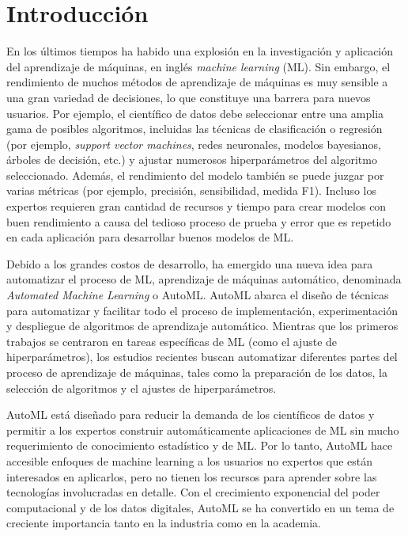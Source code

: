 \chapter*{Introducción}\label{chapter:introduction}

\qquad 

En los últimos tiempos ha habido una explosión en la investigación y aplicación del aprendizaje de máquinas, en inglés \textit{machine learning} (ML). Sin embargo, el rendimiento de muchos métodos de aprendizaje de máquinas es muy sensible a una gran variedad de decisiones, lo que constituye una barrera para nuevos usuarios. Por ejemplo, el científico de datos debe seleccionar entre una amplia gama de posibles algoritmos, incluidas las técnicas de clasificación o regresión (por ejemplo, \textit{support vector machines}, redes neuronales, modelos bayesianos, árboles de decisión, etc.) y ajustar numerosos hiperparámetros del algoritmo seleccionado. Además, el rendimiento del modelo también se puede juzgar por varias métricas (por ejemplo, precisión, sensibilidad, medida F1). Incluso los expertos requieren gran cantidad de recursos y tiempo para crear modelos con buen rendimiento a causa del tedioso proceso de prueba y error que es repetido en cada aplicación para desarrollar buenos modelos de ML.

Debido a los grandes costos de desarrollo, ha emergido una nueva idea para automatizar el proceso de ML, aprendizaje de máquinas automático, denominada \textit{Automated Machine Learning} o AutoML. AutoML abarca el diseño de técnicas para automatizar y facilitar todo el proceso de implementación, experimentación y despliegue de algoritmos de aprendizaje automático. Mientras que los primeros trabajos se centraron en tareas específicas de ML (como el ajuste de hiperparámetros), los estudios recientes buscan automatizar diferentes partes del proceso de aprendizaje de máquinas, tales como la preparación de los datos, la selección de algoritmos y el ajustes de hiperparámetros.

AutoML está diseñado para reducir la demanda de los científicos de datos y permitir a los expertos construir automáticamente aplicaciones de ML sin mucho requerimiento de conocimiento estadístico y de ML. Por lo tanto, AutoML hace accesible enfoques de machine learning a los usuarios no expertos que están interesados en aplicarlos, pero no tienen los recursos para aprender sobre las tecnologías involucradas en detalle. Con el crecimiento exponencial del poder computacional y de los datos digitales, AutoML se ha convertido en un tema de creciente importancia tanto en la industria como en la academia.

